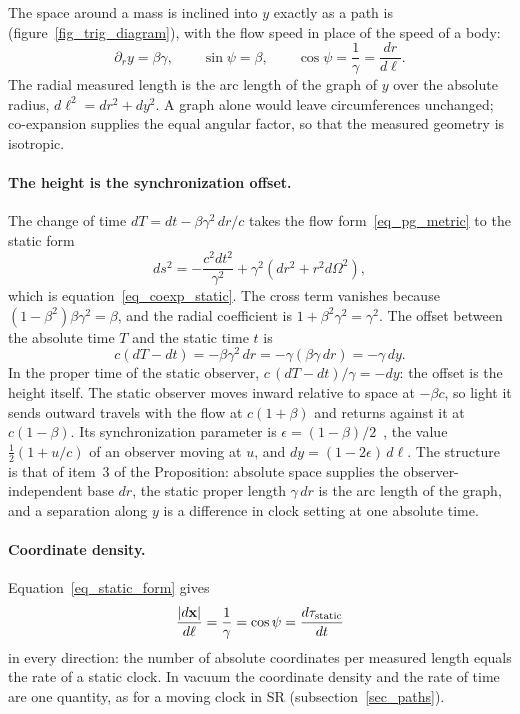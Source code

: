 \documentclass{iopjournal}
\begin{document}
The space around a mass is inclined into $y$ exactly as a path is (figure~\ref{fig_trig_diagram}), with the flow speed in place of the speed of a body:
\begin{equation}\label{eq_flamm_slope}
    \partial_r y=\beta\gamma,
    \qquad
    \sin\psi=\beta,
    \qquad
    \cos\psi=\frac{1}{\gamma}=\frac{dr}{d\ell}.
\end{equation}
The radial measured length is the arc length of the graph of $y$ over the absolute radius, $d\ell^2=dr^2+dy^2$. A graph alone would leave circumferences unchanged; co-expansion supplies the equal angular factor, so that the measured geometry is isotropic.

\paragraph{The height is the synchronization offset.} The change of time $dT=dt-\beta\gamma^2\,dr/c$ takes the flow form~\eqref{eq_pg_metric} to the static form
\begin{equation}\label{eq_static_form}
    ds^2=-\frac{c^2dt^2}{\gamma^2}+\gamma^2\left(dr^2+r^2d\Omega^2\right),
\end{equation}
which is equation~\eqref{eq_coexp_static}. The cross term vanishes because $(1-\beta^2)\beta\gamma^2=\beta$, and the radial coefficient is $1+\beta^2\gamma^2=\gamma^2$. The offset between the absolute time $T$ and the static time $t$ is
\begin{equation}\label{eq_sync_gap_flamm}
    c\left(dT-dt\right)=-\beta\gamma^2\,dr=-\gamma\left(\beta\gamma\,dr\right)=-\gamma\,dy .
\end{equation}
In the proper time of the static observer, $c\,(dT-dt)/\gamma=-dy$: the offset is the height itself. The static observer moves inward relative to space at $-\beta c$, so light it sends outward travels with the flow at $c(1+\beta)$ and returns against it at $c(1-\beta)$. Its synchronization parameter is $\epsilon=(1-\beta)/2$~\cite{Reichenbach1958}, the value $\tfrac12(1+u/c)$ of an observer moving at $u$, and $dy=(1-2\epsilon)\,d\ell$. The structure is that of item~3 of the Proposition: absolute space supplies the observer-independent base $dr$, the static proper length $\gamma\,dr$ is the arc length of the graph, and a separation along $y$ is a difference in clock setting at one absolute time.

\paragraph{Coordinate density.} Equation~\eqref{eq_static_form} gives
\begin{equation}\label{eq_density_lapse}
    \frac{|d\mathbf{x}|}{d\ell}=\frac{1}{\gamma}=\cos\psi=\frac{d\tau_{\rm static}}{dt}
\end{equation}
in every direction: the number of absolute coordinates per measured length equals the rate of a static clock. In vacuum the coordinate density and the rate of time are one quantity, as for a moving clock in SR (subsection~\ref{sec_paths}).
\end{document}
